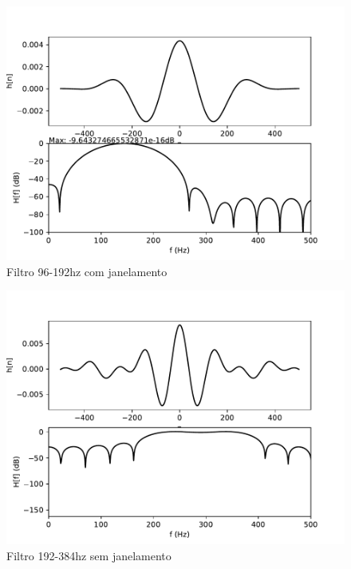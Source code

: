 \begin{figure}[H]
\begin{center}
            \includegraphics[scale=0.4]{fig/windowfilter2.pdf}\\
            \small{Filtro 96-192hz com janelamento}
        \end{center}
    \endminipage
        \begin{center}
            \includegraphics[scale=0.4]{fig/filter3.pdf}\\
            \small{Filtro 192-384hz sem janelamento}
    

\end{center}
\end{figure}

